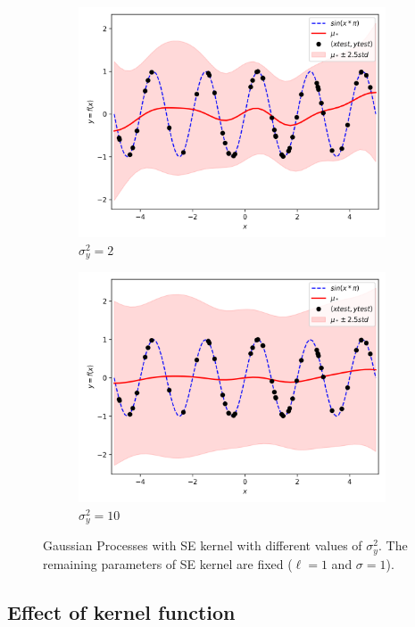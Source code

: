 \documentclass{article}
\begin{document}
\begin{figure}[ht]
\begin{subfigure}{.33\textwidth}
    \includegraphics[width=\linewidth]{kernelSE/noise/2.png}
    \caption{$\sigma_y^2 = 2$}
    \label{fig:noise2}
  \end{subfigure}
  \begin{subfigure}{.33\textwidth}
    \centering
    \includegraphics[width=\linewidth]{kernelSE/noise/10.png}
    \caption{$\sigma_y^2 = 10$}
    \label{fig:noise10}
  \end{subfigure}
  \caption{Gaussian Processes with SE kernel with different values of $\sigma_y^2$. The remaining parameters of SE kernel are fixed ($\ell = 1$ and $\sigma = 1$).}
  \label{fig:noise}
\end{figure}


\subsection{Effect of kernel function}
\end{document}
